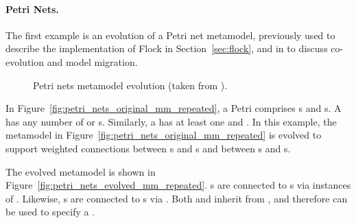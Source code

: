 \paragraph{Petri Nets.}
The first example is an evolution of a Petri net metamodel, previously used to describe the implementation of Flock in Section~\ref{sec:flock}, and in \cite{cicchetti08automating,garces09managing,wachsmuth07metamodel} to discuss co-evolution and model migration.

\begin{figure}[htbp]
	\centering
	\caption[Exemplar metamodel evolution (Petri nets)]{Petri nets metamodel evolution (taken from \cite{rose10flock}).}
\label{fig:petri_nets_mms_repeated}
\end{figure}

In Figure~\ref{fig:petri_nets_original_mm_repeated}, a Petri  comprises s and s. A  has any number of  or  s. Similarly, a  has at least one  and  . In this example, the metamodel in Figure~\ref{fig:petri_nets_original_mm_repeated} is evolved to support weighted connections between s and s and between s and s.

The evolved metamodel is shown in Figure~\ref{fig:petri_nets_evolved_mm_repeated}. s are connected to s via instances of . Likewise, s are connected to s via . Both  and  inherit from , and therefore can be used to specify a .

